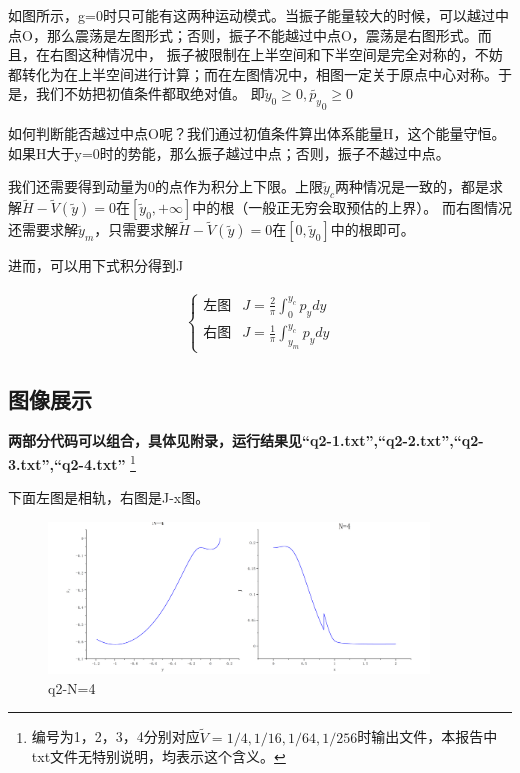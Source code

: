 \documentclass[10pt, a4paper]{article}
\newcommand{\wy}{\widetilde{y}}
\newcommand{\wV}{\widetilde{V}}
\newcommand{\wH}{\widetilde{H}}
\newcommand{\wpy}{\widetilde{p_y}}
\begin{document}
    如图所示，g=0时只可能有这两种运动模式。当振子能量较大的时候，可以越过中点O，那么震荡是左图形式；否则，振子不能越过中点O，震荡是右图形式。而且，在右图这种情况中，
    振子被限制在上半空间和下半空间是完全对称的，不妨都转化为在上半空间进行计算；而在左图情况中，相图一定关于原点中心对称。于是，我们不妨把初值条件都取绝对值。
    即$\wy_0\ge0,\wpy_0\ge 0$

    如何判断能否越过中点O呢？我们通过初值条件算出体系能量H，这个能量守恒。如果H大于y=0时的势能，那么振子越过中点；否则，振子不越过中点。

    我们还需要得到动量为0的点作为积分上下限。上限$\wy_c$两种情况是一致的，都是求解$\wH-\wV(\wy)=0$在$[\wy_0,+\infty]$中的根（一般正无穷会取预估的上界）。
    而右图情况还需要求解$\wy_m$，只需要求解$\wH-\wV(\wy)=0$在$[0,\wy_0]$中的根即可。

    进而，可以用下式积分得到J

    \begin{align}
        \begin{cases}
            \text{左图}& J=\frac{2}{\pi}\int_0^{y_c}p_ydy\\
            \text{右图}& J=\frac{1}{\pi}\int_{y_m}^{y_c}p_ydy
        \end{cases}
    \end{align}

    \subsection{图像展示}
    \textbf{两部分代码可以组合，具体见附录，运行结果见“q2-1.txt”,“q2-2.txt”,“q2-3.txt”,“q2-4.txt”}
    \footnote{编号为1，2，3，4分别对应$\wV=1/4,1/16,1/64,1/256$时输出文件，本报告中txt文件无特别说明，均表示这个含义。}

    下面左图是相轨，右图是J-x图。

    \begin{figure}[H]
        \centering
        \includegraphics[width=0.9\textwidth]{q2-N=4.jpg}
        \caption{q2-N=4}\label{q2-N=4}
    \end{figure}
\end{document}
